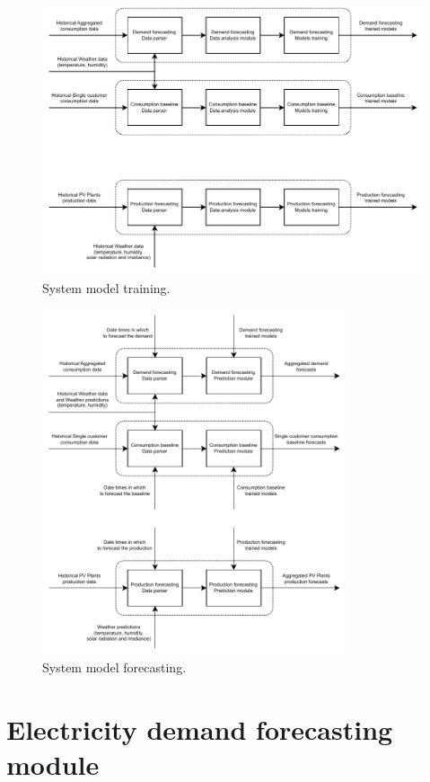 \begin{figure}[H]
\centering 
\includegraphics[width=1\textwidth]{images/system_model_training} 
\caption{System model training.}
\label{fig:modeltraining}
\end{figure}

\begin{figure}[H]
\centering 
\includegraphics[width=0.8\textwidth]{images/system_model_forecasting} 
\caption{System model forecasting.}
\label{fig:modelforecasting}
\end{figure}


\section{Electricity demand forecasting module}
\label{sec:demandmodel}
\vspace{0.2 cm}

